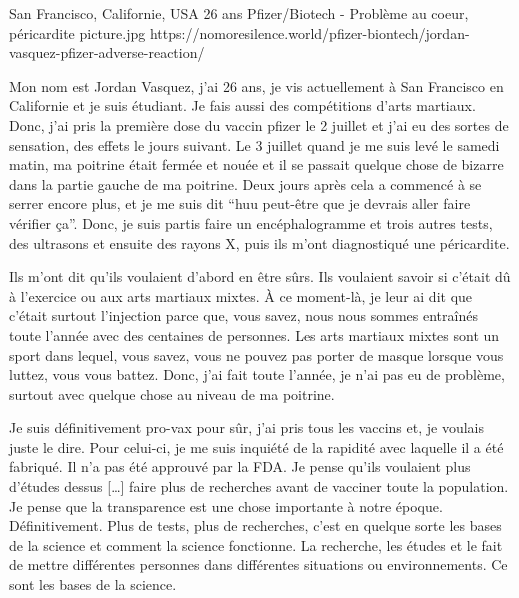 {San Francisco, Californie, USA}
{26 ans}
{Pfizer/Biotech}
{-}
{Problème au coeur, péricardite}
{picture.jpg}
{https://nomoresilence.world/pfizer-biontech/jordan-vasquez-pfizer-adverse-reaction/}
{

Mon nom est Jordan Vasquez, j'ai 26 ans, je vis actuellement à San Francisco en Californie et je suis étudiant. Je fais aussi des compétitions d'arts martiaux. Donc, j'ai pris la première dose du vaccin pfizer le 2 juillet et j'ai eu des sortes de sensation, des effets le jours suivant. Le 3 juillet quand je me suis levé le samedi matin, ma poitrine était fermée et nouée et il se passait quelque chose de bizarre dans la partie gauche de ma poitrine. Deux jours après cela a commencé à se serrer encore plus, et je me suis dit “huu peut-être que je devrais aller faire vérifier ça”. Donc, je suis partis faire un encéphalogramme et trois autres tests, des ultrasons et ensuite des rayons X, puis ils m'ont diagnostiqué une péricardite.

Ils m'ont dit qu'ils voulaient d'abord en être sûrs. Ils voulaient savoir si c'était dû à l'exercice ou aux arts martiaux mixtes. À ce moment-là, je leur ai dit que c'était surtout l'injection parce que, vous savez, nous nous sommes entraînés toute l'année avec des centaines de personnes. Les arts martiaux mixtes sont un sport dans lequel, vous savez, vous ne pouvez pas porter de masque lorsque vous luttez, vous vous battez. Donc, j'ai fait toute l'année, je n'ai pas eu de problème, surtout avec quelque chose au niveau de ma poitrine.

Je suis définitivement pro-vax pour sûr, j'ai pris tous les vaccins et, je voulais juste le dire. Pour celui-ci, je me suis inquiété de la rapidité avec laquelle il a été fabriqué. Il n'a pas été approuvé par la FDA. Je pense qu'ils voulaient plus d'études dessus […] faire plus de recherches avant de vacciner toute la population. Je pense que la transparence est une chose importante à notre époque. Définitivement. Plus de tests, plus de recherches, c'est en quelque sorte les bases de la science et comment la science fonctionne. La recherche, les études et le fait de mettre différentes personnes dans différentes situations ou environnements. Ce sont les bases de la science.

}
